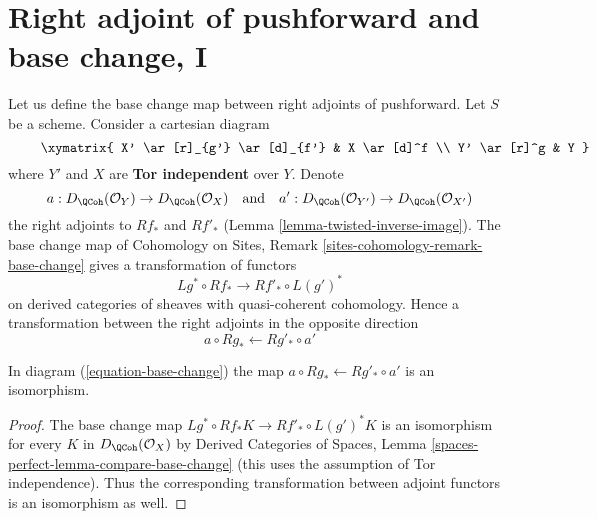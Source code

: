 \section{Right adjoint of pushforward and base change, I}
\label{section-base-change-map}

\noindent
Let us define the base change map between right adjoints of pushforward.
Let $S$ be a scheme. Consider a cartesian diagram
\begin{equation}
\label{equation-base-change}
\vcenter{
\xymatrix{
X' \ar[r]_{g'} \ar[d]_{f'} & X \ar[d]^f \\
Y' \ar[r]^g & Y
}
}
\end{equation}
where $Y'$ and $X$ are {\bf Tor independent} over $Y$. Denote
$$
a  : D_\QCoh(\mathcal{O}_Y) \to D_\QCoh(\mathcal{O}_X)
\quad\text{and}\quad
a' : D_\QCoh(\mathcal{O}_{Y'}) \to D_\QCoh(\mathcal{O}_{X'})
$$
the right adjoints to $Rf_*$ and $Rf'_*$
(Lemma \ref{lemma-twisted-inverse-image}).
The base change map of
Cohomology on Sites, Remark \ref{sites-cohomology-remark-base-change}
gives a transformation of functors
$$
Lg^* \circ Rf_* \longrightarrow Rf'_* \circ L(g')^*
$$
on derived categories of sheaves with quasi-coherent cohomology.
Hence a transformation between the right adjoints in the opposite direction
$$
a \circ Rg_* \longleftarrow Rg'_* \circ a'
$$

\begin{lemma}
\label{lemma-flat-precompose-pus}
In diagram (\ref{equation-base-change}) the map
$a \circ Rg_* \leftarrow Rg'_* \circ a'$ is an isomorphism.
\end{lemma}

\begin{proof}
The base change map $Lg^* \circ Rf_* K \to Rf'_* \circ L(g')^*K$
is an isomorphism for every $K$ in $D_\QCoh(\mathcal{O}_X)$ by
Derived Categories of Spaces, Lemma
\ref{spaces-perfect-lemma-compare-base-change}
(this uses the assumption of Tor independence).
Thus the corresponding transformation between adjoint functors
is an isomorphism as well.
\end{proof}


